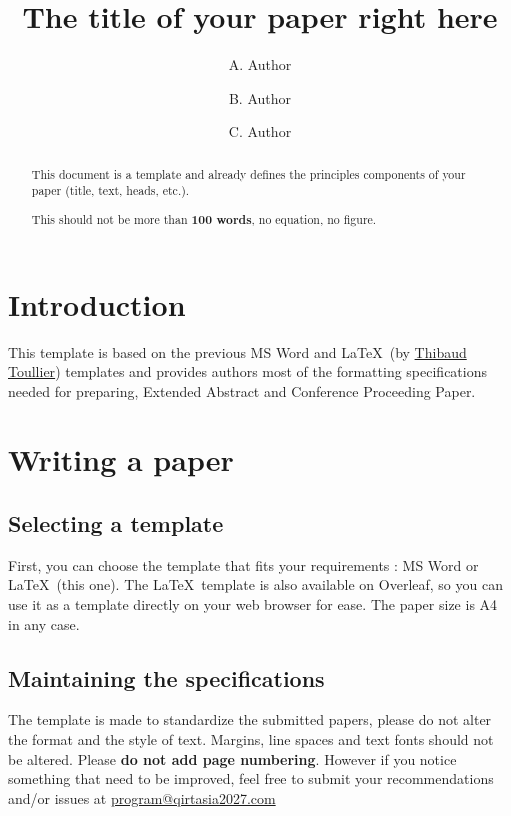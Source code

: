 \documentclass[license]{qirtconference}
\title{The title of your paper right here}
\author{A. Author}     %
\author[*]{B. Author}  %
\author[**]{C. Author} %
\affiliation{Institute, Laboratory, Team, City, Country}
\affiliation[**]{Institute, Laboratory, Team, City, Country}
\begin{document}
\maketitle 

\begin{abstract}
This document is a template and already defines the principles components of your paper (title, text, heads, etc.).

This should not be more than \textbf{100 words}, no equation, no figure.
\end{abstract}

\section{Introduction}
This template is based on the previous MS Word and \LaTeX\  (by \href{mailto:thibaud.toullier@univ-eiffel.fr}{Thibaud Toullier}) templates and provides authors most of the formatting specifications needed for preparing, Extended Abstract and Conference Proceeding Paper.

\section{Writing a paper}

\subsection{Selecting a template}

First, you can choose the template that fits your requirements : MS Word or \LaTeX\ (this one). The \LaTeX\ template is also available on Overleaf, so you can use it as a template directly on your web browser for ease.
The paper size is A4 in any case.

\subsection{Maintaining the specifications}

The template is made to standardize the submitted papers, please do not alter the format and the style of text. Margins, line spaces and text fonts should not be altered. Please \textbf{do not add page numbering}.
However if you notice something that need to be improved, feel free to submit your recommendations and/or issues at \href{mailto:program@qirtasia2027.com}{program@qirtasia2027.com}
\end{document}
